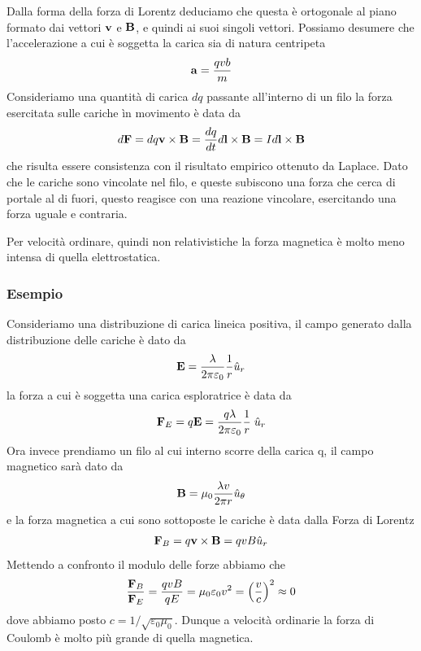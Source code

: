 Dalla forma della forza di Lorentz deduciamo che questa  \`e ortogonale al piano formato dai vettori $\bold{v}$ e $\bold{B}$, e quindi ai suoi singoli vettori. Possiamo desumere che l'accelerazione a cui \`e soggetta la carica sia di natura centripeta 
\begin{equation*}
	\bold{a} = \frac{qvb}{m}
\end{equation*}
Consideriamo una quantit\`a di carica $dq$ passante all'interno di un filo la forza esercitata sulle cariche \`in movimento \`e data da 
\begin{equation*}
	d\bold{F} = dq\bold{v} \times \bold{B} = \frac{dq}{dt}d\bold{l} \times \bold{B} = Id \bold{l} \times \bold{B}
\end{equation*}
che risulta essere consistenza con il risultato empirico ottenuto da Laplace. Dato che le cariche sono vincolate nel filo, e queste subiscono una forza che cerca di portale al di fuori, questo reagisce con una reazione vincolare, esercitando una forza uguale e contraria.

Per velocit\`a ordinare, quindi non relativistiche la forza magnetica \`e molto meno intensa di quella elettrostatica.

\subsubsection{Esempio}


Consideriamo una distribuzione di carica lineica positiva, il campo generato dalla distribuzione delle cariche \`e dato da 
\begin{equation*}
	\bold{E} = \frac{\lambda }{2 \pi \varepsilon_0}\frac{1}{r} \hat{u}_{r}
\end{equation*}
la forza a cui \`e soggetta una carica esploratrice \`e data da 
\begin{equation*}
	\bold{F}_{E} = q\bold{E} = \frac{q\lambda}{2 \pi \varepsilon_0}\frac{1}{r}\;\hat{u}_{r}
\end{equation*}
Ora invece prendiamo un filo al cui interno scorre della carica q, il campo magnetico sar\`a dato da 
\begin{equation*}
	\bold{B} = \mu_0 \frac{\lambda v}{2 \pi r}\hat{u}_{\theta}
\end{equation*}
e la forza magnetica a cui sono sottoposte le cariche \`e data dalla Forza di Lorentz
\begin{equation*}
	\bold{F}_{B} = q \bold{v} \times \bold{B} = qvB \hat{u}_{r}
\end{equation*}
Mettendo a confronto il modulo delle forze abbiamo che 
\begin{equation*}
	\frac{\bold{F}_B}{\bold{F}_E} = \frac{qvB}{qE} = \mu_0 \varepsilon_0 v^2 = \left (\frac{v}{c}\right)^2\approx 0
\end{equation*}
dove abbiamo posto $c = 1/\sqrt{\varepsilon_0\mu_0}$. Dunque a velocit\`a ordinarie la forza di Coulomb \`e molto pi\`u grande di quella  magnetica.

